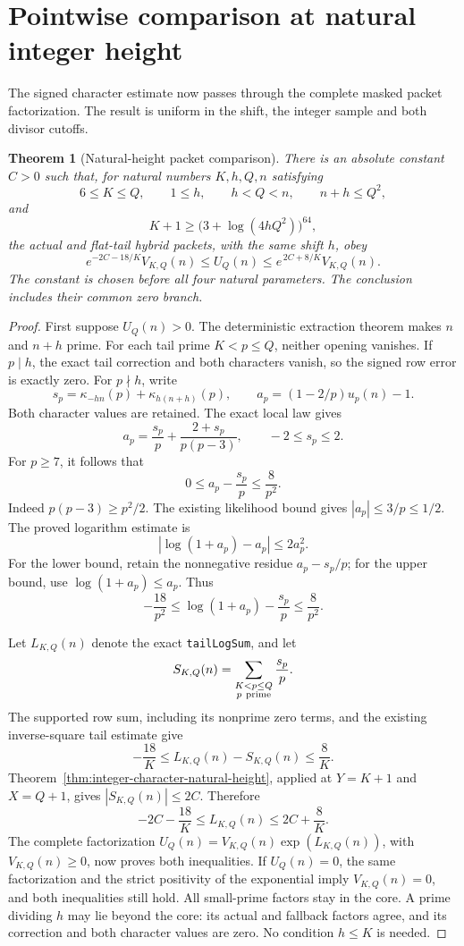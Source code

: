 \documentclass[11pt]{article}
\newtheorem{theorem}{Theorem}[section]
\begin{document}
\section{Pointwise comparison at natural integer height}
The signed character estimate now passes through the complete masked
packet factorization. The result is uniform in the shift, the integer
sample and both divisor cutoffs.

\begin{theorem}[Natural-height packet comparison]\label{thm:natural-height-packet-comparison}
There is an absolute constant \(C>0\) such that, for natural numbers
\(K,h,Q,n\) satisfying
\[
 6\leq K\leq Q,\qquad 1\leq h,\qquad h<Q<n,\qquad n+h\leq Q^2,
\]
and
\[
             K+1\geq\bigl(3+\log(4hQ^2)\bigr)^{64},
\]
the actual and flat-tail hybrid packets, with the same shift \(h\), obey
\[
 e^{-2C-18/K}V_{K,Q}(n)\leq U_Q(n)
          \leq e^{\,2C+8/K}V_{K,Q}(n).
\]
The constant is chosen before all four natural parameters. The conclusion
includes their common zero branch.
\end{theorem}

\begin{proof}
First suppose \(U_Q(n)>0\). The deterministic extraction theorem makes
\(n\) and \(n+h\) prime. For each tail prime \(K<p\leq Q\), neither opening
vanishes. If \(p\mid h\), the exact tail correction and both characters
vanish, so the signed row error is exactly zero. For \(p\nmid h\), write
\[
 s_p=\kappa_{-hn}(p)+\kappa_{h(n+h)}(p),\qquad
 a_p=(1-2/p)u_p(n)-1.
\]
Both character values are retained. The exact local law gives
\[
 a_p=\frac{s_p}{p}+\frac{2+s_p}{p(p-3)},\qquad -2\leq s_p\leq2.
\]
For \(p\geq7\), it follows that
\[
                    0\leq a_p-\frac{s_p}{p}\leq\frac8{p^2}.
\]
Indeed \(p(p-3)\geq p^2/2\). The existing likelihood bound gives
\(|a_p|\leq3/p\leq1/2\). The proved logarithm estimate is
\[
                    |\log(1+a_p)-a_p|\leq2a_p^2.
\]
For the lower bound, retain the nonnegative residue
\(a_p-s_p/p\); for the upper bound, use \(\log(1+a_p)\leq a_p\).
Thus
\[
 -\frac{18}{p^2}\leq\log(1+a_p)-\frac{s_p}{p}\leq\frac8{p^2}.
\]

Let \(L_{K,Q}(n)\) denote the exact \texttt{tailLogSum}, and let
\[
                      S_{K,Q}(n)=\sum_{\substack{K<p\leq Q\\p\ {\rm prime}}}
                                      \frac{s_p}{p}.
\]
The supported row sum, including its nonprime zero terms, and the existing
inverse-square tail estimate give
\[
 -\frac{18}{K}\leq L_{K,Q}(n)-S_{K,Q}(n)\leq\frac8K.
\]
Theorem~\ref{thm:integer-character-natural-height}, applied at
\(Y=K+1\) and \(X=Q+1\), gives \(|S_{K,Q}(n)|\leq2C\). Therefore
\[
 -2C-\frac{18}{K}\leq L_{K,Q}(n)\leq2C+\frac8K.
\]
The complete factorization
\(U_Q(n)=V_{K,Q}(n)\exp(L_{K,Q}(n))\), with \(V_{K,Q}(n)\geq0\),
now proves both inequalities.
If \(U_Q(n)=0\), the same factorization and the strict positivity of the
exponential imply \(V_{K,Q}(n)=0\), and both inequalities still hold.
All small-prime factors stay in the core. A prime dividing \(h\) may lie
beyond the core: its actual and fallback factors agree, and its correction
and both character values are zero. No condition \(h\leq K\) is needed.
\end{proof}
\end{document}
